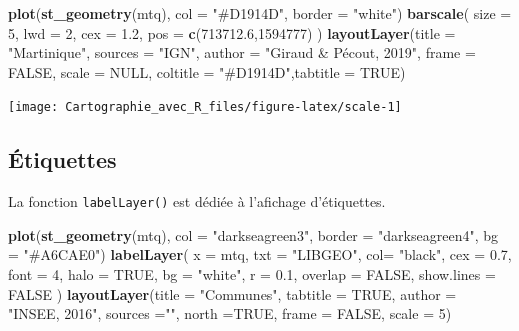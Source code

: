 \documentclass[]{book}
\newenvironment{Shaded}{\begin{snugshade}}{\end{snugshade}}
\newcommand{\KeywordTok}[1]{\textcolor[rgb]{0.13,0.29,0.53}{\textbf{#1}}}
\newcommand{\DataTypeTok}[1]{\textcolor[rgb]{0.13,0.29,0.53}{#1}}
\newcommand{\DecValTok}[1]{\textcolor[rgb]{0.00,0.00,0.81}{#1}}
\newcommand{\FloatTok}[1]{\textcolor[rgb]{0.00,0.00,0.81}{#1}}
\newcommand{\StringTok}[1]{\textcolor[rgb]{0.31,0.60,0.02}{#1}}
\newcommand{\OtherTok}[1]{\textcolor[rgb]{0.56,0.35,0.01}{#1}}
\newcommand{\NormalTok}[1]{#1}
\begin{document}
\begin{Shaded}
\begin{Highlighting}[]
\KeywordTok{plot}\NormalTok{(}\KeywordTok{st_geometry}\NormalTok{(mtq), }\DataTypeTok{col =} \StringTok{"#D1914D"}\NormalTok{, }\DataTypeTok{border =} \StringTok{"white"}\NormalTok{)}
\KeywordTok{barscale}\NormalTok{(}
  \DataTypeTok{size =} \DecValTok{5}\NormalTok{, }
  \DataTypeTok{lwd =} \DecValTok{2}\NormalTok{, }
  \DataTypeTok{cex =} \FloatTok{1.2}\NormalTok{, }
  \DataTypeTok{pos =} \KeywordTok{c}\NormalTok{(}\FloatTok{713712.6}\NormalTok{,}\DecValTok{1594777}\NormalTok{)}
\NormalTok{)}
\KeywordTok{layoutLayer}\NormalTok{(}\DataTypeTok{title =} \StringTok{"Martinique"}\NormalTok{, }\DataTypeTok{sources =} \StringTok{"IGN"}\NormalTok{, }
            \DataTypeTok{author =} \StringTok{"Giraud & Pécout, 2019"}\NormalTok{, }\DataTypeTok{frame =} \OtherTok{FALSE}\NormalTok{, }\DataTypeTok{scale =} \OtherTok{NULL}\NormalTok{,}
            \DataTypeTok{coltitle =} \StringTok{"#D1914D"}\NormalTok{,}\DataTypeTok{tabtitle =} \OtherTok{TRUE}\NormalTok{)}
\end{Highlighting}
\end{Shaded}

\begin{center}\texttt{[image: Cartographie\_avec\_R\_files/figure-latex/scale-1]} \end{center}

\subsection{Étiquettes}\label{etiquettes}

La fonction \texttt{labelLayer()} est dédiée à l'afichage d'étiquettes.

\begin{Shaded}
\begin{Highlighting}[]
\KeywordTok{plot}\NormalTok{(}\KeywordTok{st_geometry}\NormalTok{(mtq), }\DataTypeTok{col =} \StringTok{"darkseagreen3"}\NormalTok{, }\DataTypeTok{border =} \StringTok{"darkseagreen4"}\NormalTok{, }
     \DataTypeTok{bg =} \StringTok{"#A6CAE0"}\NormalTok{)}
\KeywordTok{labelLayer}\NormalTok{(}
  \DataTypeTok{x =}\NormalTok{ mtq, }
  \DataTypeTok{txt =} \StringTok{"LIBGEO"}\NormalTok{, }
  \DataTypeTok{col=} \StringTok{"black"}\NormalTok{, }
  \DataTypeTok{cex =} \FloatTok{0.7}\NormalTok{, }
  \DataTypeTok{font =} \DecValTok{4}\NormalTok{,}
  \DataTypeTok{halo =} \OtherTok{TRUE}\NormalTok{, }
  \DataTypeTok{bg =} \StringTok{"white"}\NormalTok{, }
  \DataTypeTok{r =} \FloatTok{0.1}\NormalTok{, }
  \DataTypeTok{overlap =} \OtherTok{FALSE}\NormalTok{, }
  \DataTypeTok{show.lines =} \OtherTok{FALSE}
\NormalTok{)}
\KeywordTok{layoutLayer}\NormalTok{(}\DataTypeTok{title =} \StringTok{"Communes"}\NormalTok{, }\DataTypeTok{tabtitle =} \OtherTok{TRUE}\NormalTok{, }\DataTypeTok{author =} \StringTok{"INSEE, 2016"}\NormalTok{, }
            \DataTypeTok{sources =}\StringTok{""}\NormalTok{, }\DataTypeTok{north =}\OtherTok{TRUE}\NormalTok{, }\DataTypeTok{frame =} \OtherTok{FALSE}\NormalTok{, }\DataTypeTok{scale =} \DecValTok{5}\NormalTok{)}
\end{Highlighting}
\end{Shaded}
\end{document}
